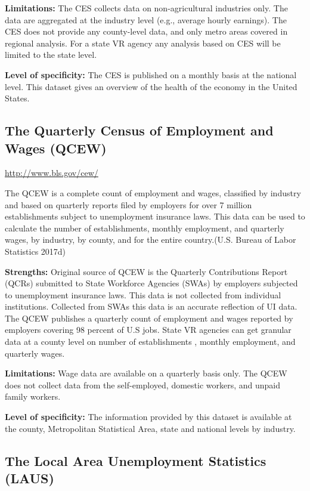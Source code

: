 \documentclass[]{book}
\theoremstyle{definition}
\theoremstyle{definition}
\theoremstyle{definition}
\theoremstyle{remark}
\begin{document}
\textbf{Limitations:} The CES collects data on non-agricultural
industries only. The data are aggregated at the industry level (e.g.,
average hourly earnings). The CES does not provide any county-level
data, and only metro areas covered in regional analysis. For a state VR
agency any analysis based on CES will be limited to the state level.

\textbf{Level of specificity:} The CES is published on a monthly basis
at the national level. This dataset gives an overview of the health of
the economy in the United States.

\subsection{The Quarterly Census of Employment and Wages
(QCEW)}\label{the-quarterly-census-of-employment-and-wages-qcew}

\url{http://www.bls.gov/cew/}

The QCEW is a complete count of employment and wages, classified by
industry and based on quarterly reports filed by employers for over 7
million establishments subject to unemployment insurance laws. This data
can be used to calculate the number of establishments, monthly
employment, and quarterly wages, by industry, by county, and for the
entire country.(U.S. Bureau of Labor Statistics 2017d)

\textbf{Strengths:} Original source of QCEW is the Quarterly
Contributions Report (QCRs) submitted to State Workforce Agencies (SWAs)
by employers subjected to unemployment insurance laws. This data is not
collected from individual institutions. Collected from SWAs this data is
an accurate reflection of UI data. The QCEW publishes a quarterly count
of employment and wages reported by employers covering 98 percent of U.S
jobs. State VR agencies can get granular data at a county level on
number of establishments , monthly employment, and quarterly wages.

\textbf{Limitations:} Wage data are available on a quarterly basis only.
The QCEW does not collect data from the self-employed, domestic workers,
and unpaid family workers.

\textbf{Level of specificity:} The information provided by this dataset
is available at the county, Metropolitan Statistical Area, state and
national levels by industry.

\subsection{The Local Area Unemployment Statistics
(LAUS)}\label{the-local-area-unemployment-statistics-laus}
\end{document}
